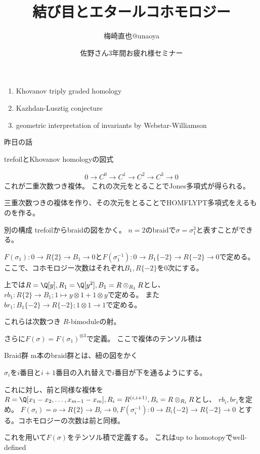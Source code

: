 \documentclass[dvipdfmx]{beamer}
\title{結び目とエタールコホモロジー}
\author{梅崎直也@unaoya}
\date{佐野さん3年間お疲れ様セミナー}
\begin{document}
\begin{frame}
\maketitle
\end{frame}

\begin{frame}
\begin{enumerate}
\item Khovanov triply graded homology
\item Kazhdan-Lusztig conjecture
\item geometric interpretation of invariants by Webstar-Williamson
\end{enumerate}
\end{frame}

\begin{frame}{昨日の話}

trefoilとKhovanov homologyの図式

\begin{align*}
0 \to C^0 \to C^1 \to C^2 \to C^3 \to 0
\end{align*}
これが二重次数つき複体。
これの次元をとることでJones多項式が得られる。

三重次数つきの複体を作り、その次元をとることでHOMFLYPT多項式をえるものを作る。
\end{frame}

\begin{frame}{別の構成}
trefoilからbraidの図をかく。
$n=2$のbraidで$\sigma=\sigma_1^3$と表すことができる。

$F(\sigma_1):0\to R\{2\} \to B_1 \to0$と$F(\sigma_1^{-1}):0 \to B_1\{-2\} \to R\{-2\}\to0$で定める。
ここで、コホモロジー次数はそれぞれ$B_1, R\{-2\}$を$0$次にする。

上では$R=\Q[y], R_1=\Q[y^2], B_1=R\otimes_{R_1}R$とし、
$rb_1:R\{2\} \to B_1; 1 \mapsto y\otimes1+1\otimes y$で定める。
また$br_1:B_1\{-2\} \to R\{-2\}; 1\otimes 1\to1$で定める。

これらは次数つき $R$-bimoduleの射。

さらに$F(\sigma)=F(\sigma_1)^{\otimes 3}$で定義。
ここで複体のテンソル積は
\end{frame}

\begin{frame}{Braid群}
m本のbraid群とは、紐の図をかく

$\sigma_i$を$i$番目と$i+1$番目の入れ替えで$i$番目が下を通るようにする。

これに対し、前と同様な複体を
$R=\Q[x_1-x_2, \ldots, x_{m-1}-x_m], R_i=R^{(i, i+1)}, B_i=R\otimes_{R_i}R$とし、
$rb_i, br_i$を定め。
$F(\sigma_i)=o\to R\{2\} \to B_i \to0, F(\sigma_i^{-1}):0 \to B_i\{-2\} \to R\{-2\} \to 0$
とする。コホモロジーの次数は前と同様。

これを用いて$F(\sigma)$をテンソル積で定義する。
これはup to homotopyでwell-defined
\end{frame}
\end{document}
